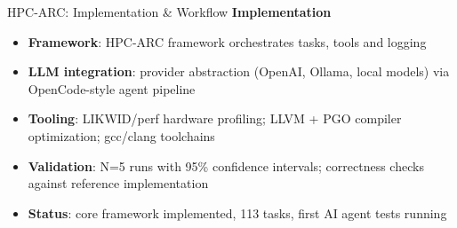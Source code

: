 \documentclass[compress,aspectratio=169]{beamer}
\begin{document}
\begin{frame}{HPC-ARC: Implementation \& Workflow}
    \vspace{0.3em}
    \textbf{Implementation}
    \vspace{0.2em}
    \scriptsize
    \begin{itemize}
        \item \textbf{Framework}: HPC-ARC framework orchestrates tasks, tools and logging
        \item \textbf{LLM integration}: provider abstraction (OpenAI, Ollama, local models) via OpenCode-style agent pipeline
        \item \textbf{Tooling}: LIKWID/perf hardware profiling; LLVM + PGO compiler optimization; gcc/clang toolchains
        \item \textbf{Validation}: N=5 runs with 95\% confidence intervals; correctness checks against reference implementation
        \item \textbf{Status}: core framework implemented, 113 tasks, first AI agent tests running
    \end{itemize}
\end{frame}
\end{document}

